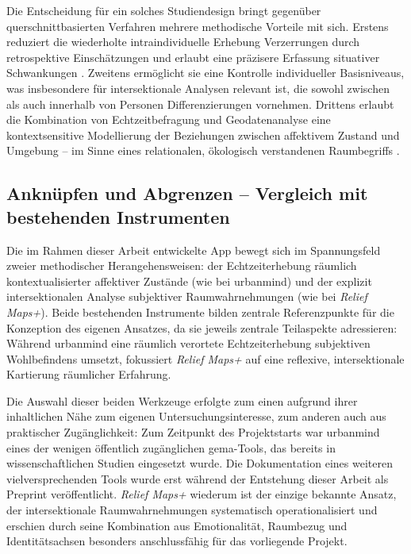 Die Entscheidung für ein solches Studiendesign bringt gegenüber querschnittbasierten Verfahren mehrere methodische Vorteile mit sich. Erstens reduziert die wiederholte intraindividuelle Erhebung Verzerrungen durch retrospektive Einschätzungen und erlaubt eine präzisere Erfassung situativer Schwankungen \parencite{randallDevelopmentTrialMobile2013}. Zweitens ermöglicht sie eine Kontrolle individueller Basisniveaus, was insbesondere für intersektionale Analysen relevant ist, die sowohl zwischen als auch innerhalb von Personen Differenzierungen vornehmen. Drittens erlaubt die Kombination von Echtzeitbefragung und Geodatenanalyse eine kontextsensitive Modellierung der Beziehungen zwischen affektivem Zustand und Umgebung -- im Sinne eines relationalen, ökologisch verstandenen Raumbegriffs \parencite{mascherekMeadowsAsphaltRoad2025}.


\subsection{Anknüpfen und Abgrenzen -- Vergleich mit bestehenden Instrumenten}

Die im Rahmen dieser Arbeit entwickelte App bewegt sich im Spannungsfeld zweier methodischer Herangehensweisen: der Echtzeiterhebung räumlich kontextualisierter affektiver Zustände (wie bei \gls{urbanmind}) und der explizit intersektionalen Analyse subjektiver Raumwahrnehmungen (wie bei \textit{Relief Maps+}). Beide bestehenden Instrumente bilden zentrale Referenzpunkte für die Konzeption des eigenen Ansatzes, da sie jeweils zentrale Teilaspekte adressieren: Während \gls{urbanmind} eine räumlich verortete Echtzeiterhebung subjektiven Wohlbefindens umsetzt, fokussiert \textit{Relief Maps+} auf eine reflexive, intersektionale Kartierung räumlicher Erfahrung.

Die Auswahl dieser beiden Werkzeuge erfolgte zum einen aufgrund ihrer inhaltlichen Nähe zum eigenen Untersuchungsinteresse, zum anderen auch aus praktischer Zugänglichkeit: Zum Zeitpunkt des Projektstarts war \gls{urbanmind} eines der wenigen öffentlich zugänglichen \acrshort{gema}-Tools, das bereits in wissenschaftlichen Studien eingesetzt wurde. Die Dokumentation eines weiteren vielversprechenden Tools \parencite[\textit{\acrfull{health}},][]{wrayHealthyEnvironmentsActive2025} wurde erst während der Entstehung dieser Arbeit als Preprint veröffentlicht. \textit{Relief Maps+} wiederum ist der einzige bekannte Ansatz, der intersektionale Raumwahrnehmungen systematisch operationalisiert und erschien durch seine Kombination aus Emotionalität, Raumbezug und Identitätsachsen besonders anschlussfähig für das vorliegende Projekt.

